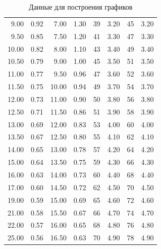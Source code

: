 \documentclass[a4paper, 12pt]{article}
\begin{document}
\begin{table}[!h]
\begin{center}
\begin{tabular}{rr|rr|rr|rr}
	9.00 & 0.92 & 7.00 & 1.30 & 39 & 3.20 & 45 & 3.20 \\
	9.50 & 0.85 & 7.50 & 1.20 & 41 & 3.30 & 47 & 3.30 \\
	10.00 & 0.82 & 8.00 & 1.10 & 43 & 3.40 & 49 & 3.40 \\
	10.50 & 0.79 & 9.00 & 1.00 & 45 & 3.50 & 51 & 3.50 \\
	11.00 & 0.77 & 9.50 & 0.96 & 47 & 3.60 & 52 & 3.60 \\
	11.50 & 0.75 & 10.00 & 0.94 & 49 & 3.70 & 54 & 3.70 \\
	12.00 & 0.73 & 11.00 & 0.90 & 50 & 3.80 & 56 & 3.80 \\
	12.50 & 0.71 & 11.50 & 0.86 & 51 & 3.90 & 58 & 3.90 \\
	13.00 & 0.69 & 12.00 & 0.83 & 53 & 4.00 & 60 & 4.00 \\
	13.50 & 0.67 & 12.50 & 0.80 & 55 & 4.10 & 62 & 4.10 \\
	14.00 & 0.65 & 13.00 & 0.78 & 57 & 4.20 & 64 & 4.20 \\
	15.00 & 0.64 & 13.50 & 0.75 & 59 & 4.30 & 66 & 4.30 \\
	16.00 & 0.63 & 14.00 & 0.73 & 60 & 4.40 & 68 & 4.40 \\
	17.00 & 0.60 & 14.50 & 0.72 & 62 & 4.50 & 70 & 4.50 \\
	19.00 & 0.59 & 15.00 & 0.69 & 65 & 4.60 & 72 & 4.60 \\
	21.00 & 0.58 & 15.50 & 0.67 & 66 & 4.70 & 74 & 4.70 \\
	22.00 & 0.57 & 16.00 & 0.65 & 68 & 4.80 & 76 & 4.80 \\
	25.00 & 0.56 & 16.50 & 0.63 & 70 & 4.90 & 78 & 4.90 \\
\bottomrule
\end{tabular}
\end{center}
\caption{Данные для построения графиков}
\label{plot_data}
\end{table}
\end{document}
